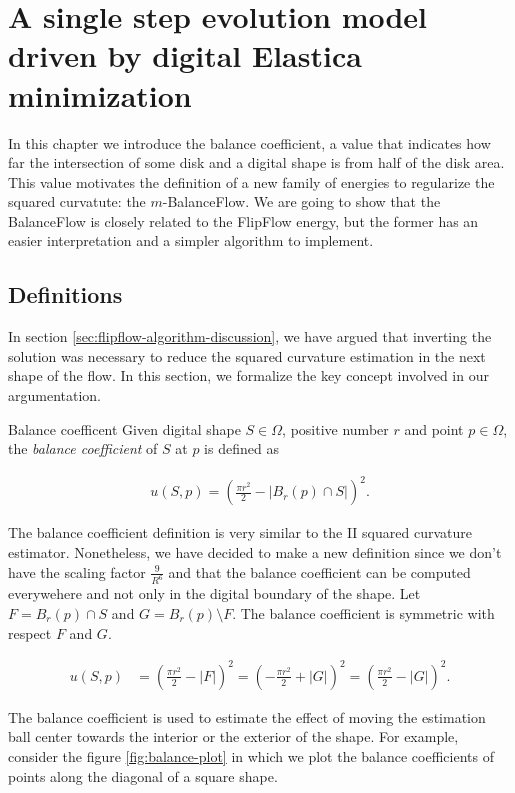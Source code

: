 \chapter{A single step evolution model driven by digital Elastica minimization}
\label{chapter:balance-flow}


In this chapter we introduce the balance coefficient, a value that indicates how far the intersection of some disk and a digital shape is from half of the disk area. This value motivates the definition of a new family of energies to regularize the squared curvatute: the $m$-BalanceFlow. We are going to show that the BalanceFlow is closely related to the FlipFlow energy, but the former has an easier interpretation and a simpler algorithm to implement.


\section{Definitions}
In section \ref{sec:flipflow-algorithm-discussion}, we have argued that inverting the solution was necessary to reduce the squared curvature estimation in the next shape of the flow. In this section, we formalize the key concept involved in our argumentation.

\begin{definition}{Balance coefficent}
Given digital shape $S \in \Omega$, positive number $r$ and point $p \in \Omega$, the \emph{balance coefficient} of $S$ at $p$ is defined as

\begin{align*}
	u(S,p) = ( \frac{\pi r^2}{2} - |B_r(p) \cap S| )^2.
\end{align*}

\end{definition}

The balance coefficient definition is very similar to the II squared curvature estimator. Nonetheless, we have decided to make a new definition since we don't have the scaling factor $\frac{9}{R^6}$ and that the balance coefficient can be computed everywehere and not only in the digital boundary of the shape. Let $F=B_r(p) \cap S$ and $G=B_r(p) \setminus F$. The balance coefficient is symmetric with respect $F$ and $G$. 

\begin{align*}
	u(S,p) &= ( \frac{\pi r^2}{2} - |F| )^2 = ( -\frac{\pi r^2}{2} + |G| )^2 = ( \frac{\pi r^2}{2} - |G| )^2.
\end{align*}

The balance coefficient is used to estimate the effect of moving the estimation ball center towards the interior or the exterior of the shape. For example, consider the figure \ref{fig:balance-plot} in which we plot the balance coefficients of points along the diagonal of a square shape. 


